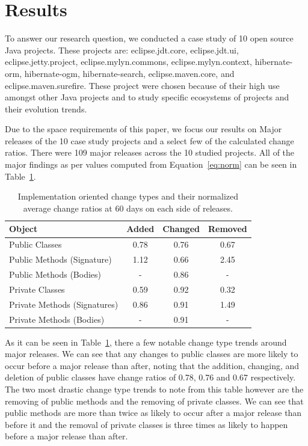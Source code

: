 \documentclass[conference]{IEEEtran}
\begin{document}
\section{Results}
\label{sec:results}

To answer our research question, we conducted a case study of 10 open source Java projects. These projects are: eclipse.jdt.core, eclipse.jdt.ui, eclipse.jetty.project, 
eclipse.mylyn.commons, eclipse.mylyn.context, hibernate-orm, hibernate-ogm, hibernate-search, eclipse.maven.core, and eclipse.maven.surefire. These project were chosen
because of their high use amongst other Java projects and to study specific ecosystems of projects and their evolution trends.

Due to the space requirements of this paper, we focus our results on Major releases of the 10 case study projects and a select few of the calculated change ratios. 
There were 109 major releases across the 10 studied projects. All of the major findings as per values computed from Equation~\ref{eq:norm}
can be seen in Table~\ref{tab:ratio}.

\begin{table}[h]
\begin{center}
\begin{tabular}{| l | c | c | c |}
\hline
Object & Added & Changed & Removed\\
\hline
Public Classes & 0.78 & 0.76 & 0.67 \\
Public Methods (Signature) & 1.12 & 0.66 & 2.45 \\
Public Methods (Bodies) & - & 0.86 & - \\
Private Classes & 0.59 & 0.92 & 0.32 \\
Private Methods (Signatures) & 0.86 & 0.91 & 1.49 \\
Private Methods (Bodies) & - & 0.91 & - \\
\hline
\end{tabular}
\end{center}
\caption{Implementation oriented change types and their normalized average change ratios at 60 days on each side of releases. \label{tab:ratio}}
\end{table}

As it can be seen in Table~\ref{tab:ratio}, there a few notable change type trends around major releases. We can see that any changes to public classes are
more likely to occur before a major release than after, noting that the addition, changing, and deletion of public classes have change ratios of 0.78, 
0.76 and 0.67 respectively. The two most drastic change type trends to note from this table however are the removing of public methods and the removing
of private classes. We can see that public methods are more than twice as likely to occur after a major release than before it and the removal of 
private classes is three times as likely to happen before a major release than after. 
\end{document}
